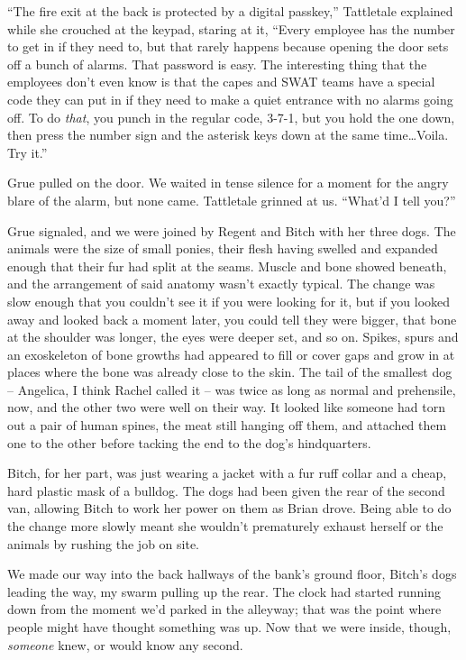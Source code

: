 ``The fire exit at the back is protected by a digital passkey,'' Tattletale explained while she crouched at the keypad, staring at it, ``Every employee has the number to get in if they need to, but that rarely happens because opening the door sets off a bunch of alarms.  That password is easy.  The interesting thing that the employees don't even know is that the capes and SWAT teams have a special code they can put in if they need to make a quiet entrance with no alarms going off.  To do \emph{that}, you punch in the regular code, 3-7-1, but you hold the one down, then press the number sign and the asterisk keys down at the same time\ldots Voila.  Try it.''



Grue pulled on the door.  We waited in tense silence for a moment for the angry blare of the alarm, but none came.  Tattletale grinned at us. ``What'd I tell you?''



Grue signaled, and we were joined by Regent and Bitch with her three dogs.  The animals were the size of small ponies, their flesh having swelled and expanded enough that their fur had split at the seams.  Muscle and bone showed beneath, and the arrangement of said anatomy wasn't exactly typical.  The change was slow enough that you couldn't see it if you were looking for it, but if you looked away and looked back a moment later, you could tell they were bigger, that bone at the shoulder was longer, the eyes were deeper set, and so on.  Spikes, spurs and an exoskeleton of bone growths had appeared to fill or cover gaps and grow in at places where the bone was already close to the skin.  The tail of the smallest dog – Angelica, I think Rachel called it – was twice as long as normal and prehensile, now, and the other two were well on their way.  It looked like someone had torn out a pair of human spines, the meat still hanging off them, and attached them one to the other before tacking the end to the dog's hindquarters.



Bitch, for her part, was just wearing a jacket with a fur ruff collar and a cheap, hard plastic mask of a bulldog.  The dogs had been given the rear of the second van, allowing Bitch to work her power on them as Brian drove.  Being able to do the change more slowly meant she wouldn't prematurely exhaust herself or the animals by rushing the job on site.



We made our way into the back hallways of the bank's ground floor, Bitch's dogs leading the way, my swarm pulling up the rear.  The clock had started running down from the moment we'd parked in the alleyway; that was the point where people might have thought something was up.  Now that we were inside, though, \emph{someone} knew, or would know any second.



